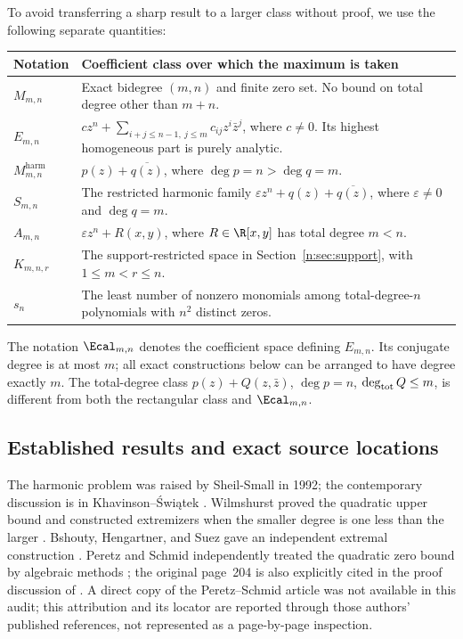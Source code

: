 \documentclass[UTF8,11pt]{ctexart}
\theoremstyle{definition}
\numberwithin{equation}{section}
\begin{document}
To avoid transferring a sharp result to a larger class without proof, we use the following separate quantities:
\begin{longtable}{@{}>{\raggedright\arraybackslash}p{}>{\raggedright\arraybackslash}p{}@{}}
\toprule
Notation & Coefficient class over which the maximum is taken \\
\midrule
\endhead
$M_{m,n}$ & Exact bidegree $(m,n)$ and finite zero set. No bound on total degree other than $m+n$.\\
$E_{m,n}$ & $cz^n+\sum_{i+j\le n-1,\ j\le m}c_{ij}z^i\bar z^j$, where $c\ne0$. Its highest homogeneous part is purely analytic.\\
$M^{\mathrm{harm}}_{m,n}$ & $p(z)+\overline{q(z)}$, where $\deg p=n>\deg q=m$.\\
$S_{m,n}$ & The restricted harmonic family $\varepsilon z^n+q(z)+\overline{q(z)}$, where $\varepsilon\ne0$ and $\deg q=m$.\\
$A_{m,n}$ & $\varepsilon z^n+R(x,y)$, where $R\in\R[x,y]$ has total degree $m<n$.\\
$K_{m,n,r}$ & The support-restricted space in Section~\ref{n:sec:support}, with $1\le m<r\le n$.\\
$s_n$ & The least number of nonzero monomials among total-degree-$n$ polynomials with $n^2$ distinct zeros.\\
\bottomrule
\end{longtable}
The notation $\Ecal_{m,n}$ denotes the coefficient space defining $E_{m,n}$. Its conjugate degree is at most $m$; all exact constructions below can be arranged to have degree exactly $m$. The total-degree class $p(z)+Q(z,\bar z)$, $\deg p=n$, $\deg_{\rm tot}Q\le m$, is different from both the rectangular class and $\Ecal_{m,n}$.

\subsection{Established results and exact source locations}\label{sec:history}
The harmonic problem was raised by Sheil-Small in 1992; the contemporary discussion is in Khavinson--\'{S}wi\k{a}tek \cite[pp.~409--410]{KS03}. Wilmshurst proved the quadratic upper bound and constructed extremizers when the smaller degree is one less than the larger \cite[pp.~2077--2080]{Wil98}. Bshouty, Hengartner, and Suez gave an independent extremal construction \cite[pp.~207--218]{BHS95}. Peretz and Schmid independently treated the quadratic zero bound by algebraic methods \cite[pp.~203--208]{PS97}; the original page~204 is also explicitly cited in the proof discussion of \cite[p.~6]{SZ24}. A direct copy of the Peretz--Schmid article was not available in this audit; this attribution and its locator are reported through those authors' published references, not represented as a page-by-page inspection.
\end{document}

